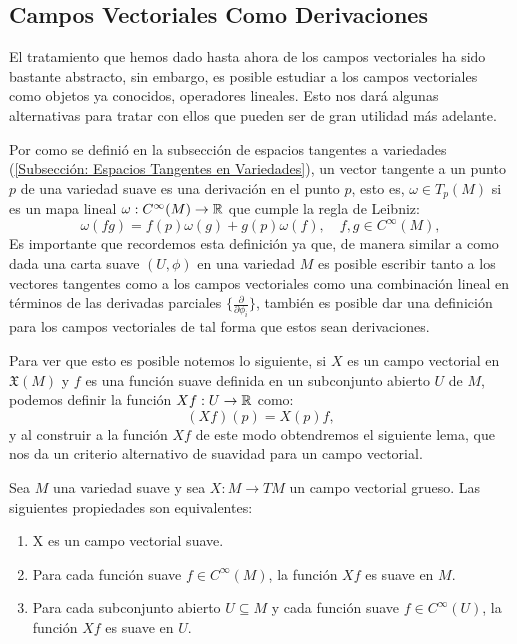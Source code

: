 \subsection{Campos Vectoriales Como Derivaciones}\label{Subsección: Campos Vectoriales Como Derivaciones}
El tratamiento que hemos dado hasta ahora de los campos vectoriales ha sido bastante abstracto, sin embargo, es posible estudiar a los campos vectoriales como objetos ya conocidos, operadores lineales. Esto nos dará algunas alternativas para tratar con ellos que pueden ser de gran utilidad más adelante.

Por como se definió en la subsección de espacios tangentes a variedades (\ref{Subsección: Espacios Tangentes en Variedades}), un vector tangente a un punto $p$ de una variedad suave es una derivación en el punto $p$, esto es, $\omega \in T_p(M)$ si es un mapa lineal $\omega: C^{\infty}(M) \to \mathbb{R}$ que cumple la regla de Leibniz:
\[
	\omega(fg) = f(p)\omega(g) + g(p) \omega(f), \quad f,g \in C^{\infty}(M),
\]
Es importante que recordemos esta definición ya que, de manera similar a como dada una carta suave $(U,\phi)$ en una variedad $M$ es posible escribir tanto a los vectores tangentes como a los campos vectoriales como una combinación lineal en términos de las derivadas parciales $\{\frac{\partial}{\partial \phi_i}\}$, también es posible dar una definición para los campos vectoriales de tal forma que estos sean derivaciones.

Para ver que esto es posible notemos lo siguiente, si $X$ es un campo vectorial en $\mathfrak{X}(M)$ y $f$ es una función suave definida en un subconjunto abierto $U$ de $M$, podemos definir la función $Xf: U \to \mathbb{R}$ como:
\[
	(Xf)(p) = X(p)f,
\]
y al construir a la función $Xf$ de este modo obtendremos el siguiente lema, que nos da un criterio alternativo de suavidad para un campo vectorial.

\begin{lemma}
	Sea $M$ una variedad suave y sea $X:M \to TM$ un campo vectorial grueso. Las siguientes propiedades son equivalentes:
	\begin{enumerate}
		\item X es un campo vectorial suave.
		\item Para cada función suave $f \in C^{\infty}(M)$, la función $Xf$ es suave en $M$.
		\item Para cada subconjunto abierto $U \subseteq M$ y cada función suave $f \in C^{\infty}(U)$, la función $Xf$ es suave en $U$.
	\end{enumerate}
\end{lemma}

